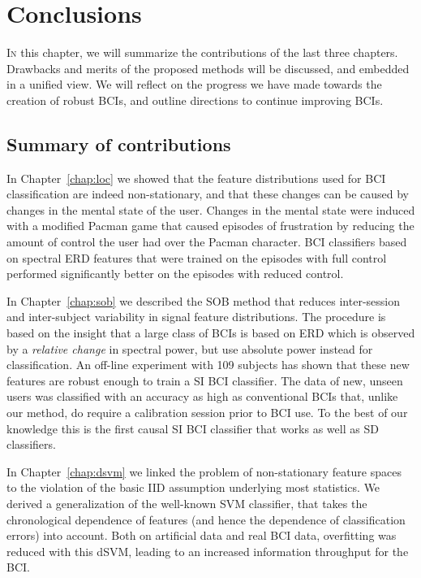 \chapter{Conclusions}
\lettrine{I}{n} this chapter, we will summarize the contributions of the last
three chapters. Drawbacks and merits of the proposed methods will be discussed,
and embedded in a unified view. We will reflect on the progress we have made
towards the creation of robust \acp{BCI}, and outline directions to continue
improving \acp{BCI}.

\section{Summary of contributions}
In Chapter~\ref{chap:loc} we showed that the feature distributions used for
\ac{BCI} classification are indeed non-stationary, and that these changes can
be caused by changes in the mental state of the user.
%
Changes in the mental state were induced with a modified Pacman game that
caused episodes of frustration by reducing the amount of control the user had
over the Pacman character. \Ac{BCI} classifiers based on spectral \ac{ERD}
features that were trained on the episodes with full control performed
significantly better on the episodes with reduced control.

In Chapter~\ref{chap:sob} we described the \ac{SOB} method that reduces inter-session and inter-subject variability in signal feature
distributions. The procedure is based on the insight that a large class of
\acp{BCI} is based on \ac{ERD} which is observed by a \emph{relative change} in
spectral power, but use absolute power instead for classification. An off-line
experiment with 109 subjects has shown that these new features are robust
enough to train a \ac{SI} \ac{BCI} classifier. 
%
The data of new, unseen users was classified with an accuracy as high as
conventional \acp{BCI} that, unlike our method, do require a calibration
session prior to \ac{BCI} use. To the best of our knowledge this is the first
causal \ac{SI} \ac{BCI} classifier that works as well as \ac{SD} classifiers.

In Chapter~\ref{chap:dsvm} we linked the problem of non-stationary feature
spaces to the violation of the basic \ac{IID} assumption underlying most
statistics. We derived a generalization of the well-known \ac{SVM} classifier,
that takes the chronological dependence of features (and hence the dependence
of classification errors) into account. Both on artificial data and real
\ac{BCI} data, overfitting was reduced with this \ac{dSVM}, leading to an
increased information throughput for the \ac{BCI}.

